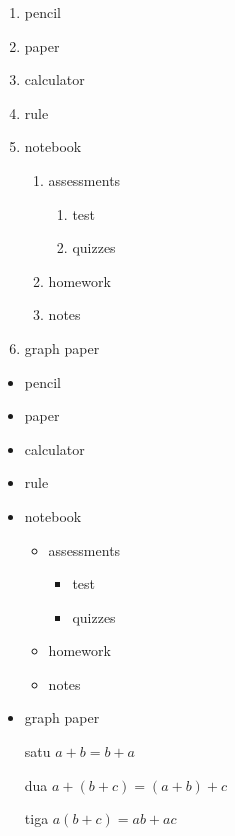 \documentclass[11pt]{article}
\begin{document}
	
\begin{enumerate}
	\item pencil
	\item paper
	\item calculator
	\item rule
	\item notebook
		\begin{enumerate}
			\item assessments
				\begin{enumerate}
					\item test
					\item quizzes
				\end{enumerate}
			\item homework
			\item notes		
		\end{enumerate}
	\item graph paper	
\end{enumerate}		

\begin{itemize}
	\item pencil
	\item paper
	\item calculator
	\item rule
	\item notebook
		\begin{itemize}
			\item assessments
				\begin{itemize}
					\item test
					\item quizzes
				\end{itemize}
			\item homework
			\item notes		
		\end{itemize}
	\item graph paper	
\end{itemize}		

\begin{enumerate}
\item[satu] $a+b = b+a$
\item[dua] 	$a+(b+c)=(a+b)+c$
\item[tiga] $a(b+c)=ab+ac$
\end{enumerate}
	
\end{document}
